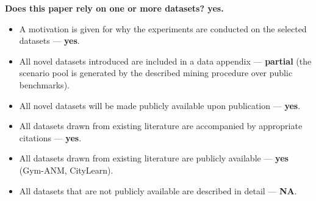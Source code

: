 \documentclass[letterpaper]{article} %
\theoremstyle{plain}
\begin{document}
\noindent\textbf{Does this paper rely on one or more datasets? yes.}
\begin{itemize}\setlength{\itemsep}{0pt}
\item A motivation is given for why the experiments are conducted on the selected datasets --- \textbf{yes}.
\item All novel datasets introduced are included in a data appendix --- \textbf{partial} (the scenario pool is generated by the described mining procedure over public benchmarks).
\item All novel datasets will be made publicly available upon publication --- \textbf{yes}.
\item All datasets drawn from existing literature are accompanied by appropriate citations --- \textbf{yes}.
\item All datasets drawn from existing literature are publicly available --- \textbf{yes} (Gym-ANM, CityLearn).
\item All datasets that are not publicly available are described in detail --- \textbf{NA}.
\end{itemize}
\end{document}
